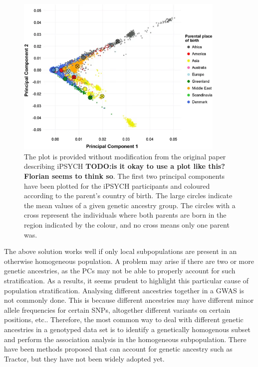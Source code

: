 \begin{figure}
	\includegraphics[width=10cm]{methods/iPSYCH_PCPlot.png}
	\caption[Scatter plot of the first two principal components of iPSYCH 
	participants coloured by parental country of birth]{The plot is provided without modification from the original paper describing 
	iPSYCH \cite{pedersen2018ipsych2012} \textbf{TODO:is it okay 
	to use a plot like this? Florian seems to think so}. The first two principal components have been 
	plotted for the iPSYCH participants and coloured according to the parent's 
	country of birth. The large circles indicate the mean values of a given 
	genetic ancestry group. The circles with a cross represent the individuals 
	where both parents are born in the region indicated by the colour, and no 
	cross means only one parent was.}
	\label{fig:ipsych_PCPlot}
\end{figure}


The above solution works well if only local subpopulations are present in an otherwise homogeneous population. A problem may arise if there are two or more genetic ancestries, as the PCs may not be able to properly account for such stratification. As a results, it seems prudent to highlight this particular cause of population stratification. Analysing different ancestries together in a GWAS is not commonly done. This is because different ancestries may have different minor allele frequencies for certain SNPs, altogether different variants on certain positions, etc.\cite{helgason2005icelandic}. Therefore, the most common way to deal with different genetic ancestries in a genotyped data set is to identify a genetically homogenous subset and perform the association analysis in the homogeneous subpopulation. There have been methods proposed that can account for genetic ancestry such as Tractor\cite{atkinson2021tractor}, but they have not been widely adopted yet. 


